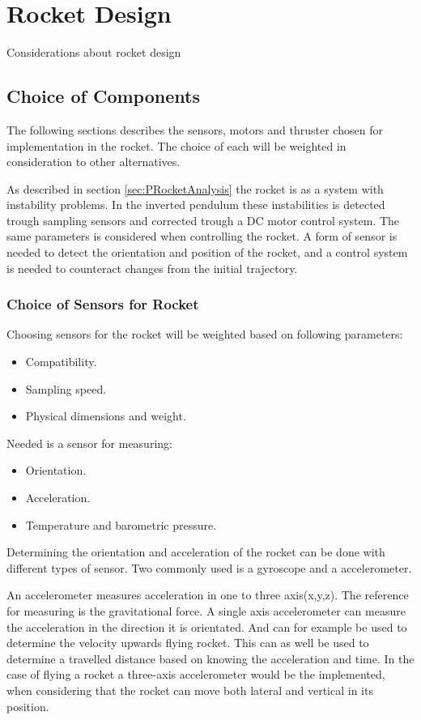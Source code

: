 
\chapter{Rocket Design}

Considerations about rocket design

\section{Choice of Components}
The following sections describes the sensors, motors and thruster chosen for implementation in the rocket. The choice of each will be weighted in consideration to other alternatives.   

As described in section \ref{sec:PRocketAnalysis} the rocket is as a system with instability problems. In the inverted pendulum these instabilities is detected trough sampling sensors and corrected trough a DC motor control system. The same parameters is considered when controlling the rocket. A form of sensor is needed to detect the orientation and position of the rocket, and a control system is needed to counteract changes from the initial trajectory.

\subsection{Choice of Sensors for Rocket}
Choosing sensors for the rocket will be weighted based on following parameters:

\begin{itemize}[noitemsep]
\item Compatibility.
\item Sampling speed.
\item Physical dimensions and weight.
\end{itemize}

Needed is a sensor for measuring:
\begin{itemize}[noitemsep]
\item Orientation.
\item Acceleration.
\item Temperature and barometric pressure.
\end{itemize}

Determining the orientation and acceleration of the rocket can be done with different types of sensor. Two commonly used is a gyroscope and a accelerometer. 


An accelerometer measures acceleration in one to three axis(x,y,z). The reference for measuring is the gravitational force. A single axis accelerometer can measure the acceleration in the direction it is orientated. And can for example be used to determine the velocity upwards flying rocket. This can as well be used to determine a travelled distance based on knowing the acceleration and time. In the case of flying a rocket a three-axis accelerometer would be the implemented, when considering that the rocket can move both lateral and vertical in its position.  


